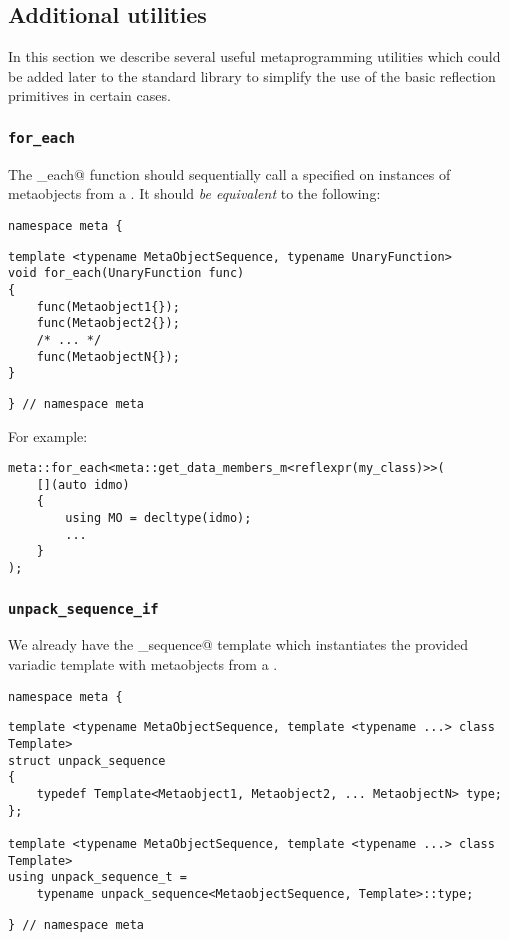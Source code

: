 \subsection{Additional utilities}
\label{fut-facade}

In this section we describe several useful metaprogramming utilities which
could be added later to the standard library to simplify the use of the basic
reflection primitives in certain cases.
 
\subsubsection{\texttt{for\_each}}
\label{fac-for-each}

The \verb@for_each@ function should sequentially call a specified
\verb@UnaryFunction@ on instances of metaobjects from
a . It should {\em be equivalent} to the following:

\begin{verbatim}
namespace meta {
\end{verbatim}
\begin{verbatim}
template <typename MetaObjectSequence, typename UnaryFunction>
void for_each(UnaryFunction func)
{
	func(Metaobject1{});
	func(Metaobject2{});
	/* ... */
	func(MetaobjectN{});
}
\end{verbatim}
\begin{verbatim}
} // namespace meta
\end{verbatim}

For example:

\begin{verbatim}
meta::for_each<meta::get_data_members_m<reflexpr(my_class)>>(
	[](auto idmo)
	{
		using MO = decltype(idmo);
		...
	}
);
\end{verbatim}

\subsubsection{\texttt{unpack\_sequence\_if}}
\label{fac-unpack-sequence}

We already have the \verb@unpack_sequence@ template which instantiates
the provided variadic template with metaobjects from a .

\begin{verbatim}
namespace meta {
\end{verbatim}
\begin{verbatim}
template <typename MetaObjectSequence, template <typename ...> class Template>
struct unpack_sequence
{
	typedef Template<Metaobject1, Metaobject2, ... MetaobjectN> type;
};

template <typename MetaObjectSequence, template <typename ...> class Template>
using unpack_sequence_t =
	typename unpack_sequence<MetaobjectSequence, Template>::type;
\end{verbatim}
\begin{verbatim}
} // namespace meta
\end{verbatim}

